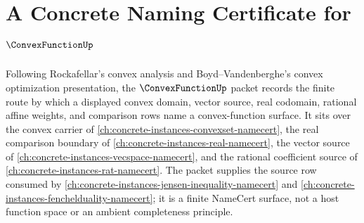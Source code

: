 \chapter{A Concrete Naming Certificate for $\ConvexFunctionUp$}
\label{ch:concrete-instances-convex-function-namecert}

Following Rockafellar's convex analysis and Boyd--Vandenberghe's convex optimization presentation, the $\ConvexFunctionUp$ packet records the finite route by which a displayed convex domain, vector source, real codomain, rational affine weights, and comparison rows name a convex-function surface. It sits over the convex carrier of \autoref{ch:concrete-instances-convexset-namecert}, the real comparison boundary of \autoref{ch:concrete-instances-real-namecert}, the vector source of \autoref{ch:concrete-instances-vecspace-namecert}, and the rational coefficient source of \autoref{ch:concrete-instances-rat-namecert}. The packet supplies the source row consumed by \autoref{ch:concrete-instances-jensen-inequality-namecert} and \autoref{ch:concrete-instances-fenchelduality-namecert}; it is a finite NameCert surface, not a host function space or an ambient completeness principle.

